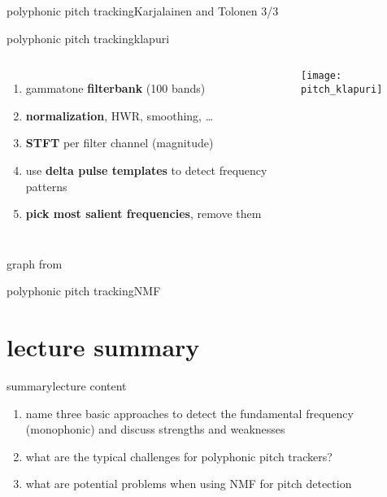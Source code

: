 	\begin{frame}{polyphonic pitch tracking}{Karjalainen and Tolonen 3/3}
	\end{frame}
	
	\begin{frame}{polyphonic pitch tracking}{klapuri}
        \begin{columns}[T]
                \begin{enumerate}
                    \item	gammatone \textbf{filterbank} (100 bands)
                    \item<2->	\textbf{normalization}, HWR, smoothing, \ldots
                    \item<3->	\textbf{STFT} per filter channel (magnitude)
                    \item<4->	use \textbf{delta pulse templates} to detect frequency patterns
                    \item<5->	\textbf{pick most salient frequencies}, remove them
                \end{enumerate}
                \texttt{[image: pitch\_klapuri]}
        \end{columns}
    \bigskip
    
    \begin{flushright}
        graph from 
    \end{flushright}
	\end{frame}
    
	\begin{frame}{polyphonic pitch tracking}{NMF}
	\end{frame}
            
   \section[summary]{lecture summary}
        \begin{frame}{summary}{lecture content}
            \begin{enumerate}
                \item    name three basic approaches to detect the fundamental frequency (monophonic) and discuss strengths and weaknesses
                \smallskip
                \item<2->  what are the typical challenges for polyphonic pitch trackers?
                \smallskip
                \item<3->    what are potential problems when using NMF for pitch detection
            \end{enumerate}
        \end{frame}


